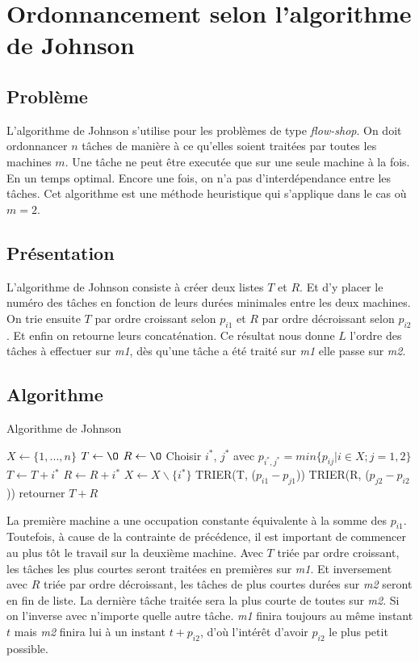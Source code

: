 \section{Ordonnancement selon l'algorithme de Johnson}
\subsection{Problème}
L'algorithme de Johnson s'utilise pour les problèmes de type {\em flow-shop}.
On doit ordonnancer $n$ tâches de manière à ce qu'elles soient traitées par
toutes les machines $m$.
Une tâche ne peut être executée que sur une seule machine à la
fois. En un temps optimal. Encore une fois, on n'a pas d'interdépendance entre
les tâches. Cet algorithme est une méthode heuristique qui s'applique 
dans le cas où $m=2$.

\subsection{Présentation}
L'algorithme de Johnson consiste à créer deux listes $T$ et $R$. Et d'y placer 
le numéro des tâches en fonction de leurs durées minimales entre les deux 
machines. On trie ensuite $T$ par ordre croissant selon $p_{i1}$ et $R$ par
ordre décroissant selon $p_{i2}$. Et enfin on retourne leurs concaténation.
Ce résultat nous donne $L$ l'ordre des tâches à effectuer sur {\em m1},
dès qu'une tâche a été traité sur {\em m1} elle passe sur {\em m2}.

\subsection{Algorithme}
\begin{algorithm}
\caption{Algorithme de Johnson}
\begin{algorithmic}
\STATE $X \leftarrow \{1,...,n\}$
\STATE $T \leftarrow \O$
\STATE $R \leftarrow \O$
	\STATE Choisir $i^*$, $j^*$ avec $p_{i^*,j^*} = min\{p_{ij}|i \in X; j = 1,2\}$
		\STATE $T \leftarrow T + i^*$
	\ELSE
		\STATE $R \leftarrow R + i^*$
	\ENDIF
	\STATE $X \leftarrow X\backslash\{i^*\}$
\ENDWHILE
\STATE TRIER(T, ($p_{i1} - p_{j1}$))
\STATE TRIER(R, ($p_{j2} - p_{i2}$))
\STATE retourner $T + R$
\end{algorithmic}
\end{algorithm}

La première machine a une occupation constante équivalente à la somme des
$p_{i1}$. Toutefois, à cause de la contrainte de précédence, il est important de
commencer au plus tôt le travail sur la deuxième machine. Avec $T$ triée par
ordre croissant, les tâches les plus courtes seront traitées en premières sur
{\em m1}. Et inversement avec $R$ triée par ordre décroissant, les tâches de
plus courtes durées sur {\em m2} seront en fin de liste. La dernière tâche
traitée sera la plus courte de toutes sur {\em m2}. Si on l'inverse avec
n'importe quelle autre tâche. {\em m1} finira toujours au même instant $t$ mais
{\em m2} finira lui à un instant $t+p_{i2}$, d'où l'intérêt d'avoir $p_{i2}$ le
plus petit possible.

